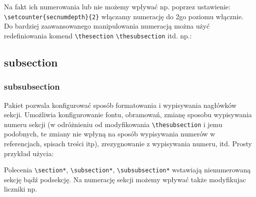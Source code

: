 \documentclass[fontSize=10pt,extra]{pdfArticle}
\begin{document}
Na fakt ich numerowania lub nie możemy wpływać np. poprzez ustawienie:\\ \Verb#\setcounter{secnumdepth}{2}# włączamy numerację do 2go poziomu włącznie.
Do bardziej zaawansowanego manipulowania numeracją można użyć redefiniowania komend \Verb#\thesection# \Verb#\thesubsection# itd. np.:
\begin{Example}
\renewcommand{\thesubsection}{
  \thesection-\arabic{subsection})
}
\renewcommand{\thesubsubsection}{
  \thesection-\arabic{subsection}-\arabic{subsubsection})
}
\subsection{subsection}
\subsubsection{subsubsection}
\end{Example}

Pakiet  pozwala konfigurować sposób formatowania i wypisywania nagłówków sekcji.
Umożliwia konfigurowanie fontu, obramowań, zmianę sposobu wypisywania numeru sekcji
	(w odróżnieniu od modyfikowania \Verb$\thesubsection$ i jemu podobnych, te zmiany nie wpłyną na sposób wypisywania numerów w referencjach, spisach treści itp),
	zrezygnowanie z wypisywania numeru, itd.
Prosty przykład  użycia:

Polecenia \Verb$\section*$, \Verb$\subsection*$, \Verb$\subsubsection*$ wstawiają nienumerowaną sekcję bądź podsekcję.
Na numerację sekcji możemy wpływać także modyfikujac liczniki np.
\begin{Example}
\setcounter{section}{2}
\setcounter{subsection}{0}
\end{Example}
\end{document}
